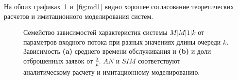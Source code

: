 \documentclass[a4paper,12 pt]{article}
\begin{document}
На обоих графиках~\ref{fig:mm1k} и~\ref{fig:md1} видно хорошее согласование теоретических расчетов и имитационного моделирования систем.
\begin{figure}[H]%
	\begin{subfigure}{\textwidth}
		\caption{}
	\end{subfigure}
	\hspace{\fill}%
	\begin{subfigure}{\textwidth}
		\caption{}
	\end{subfigure}
	\caption{Семейство зависимостей характеристик системы $M|M|1|k $ от параметров входного потока при разных значениях длины очереди $k$. Зависимость \textbf{(a)} среднего времени обслуживания и \textbf{(b)} и доли отброшенных заявок от $\frac{\lambda}{\mu}$. $AN$ и $SIM$ соответствуют аналитическому расчету и имитационному моделированию.}
	\label{fig:mm1k}
\end{figure}
\end{document}
